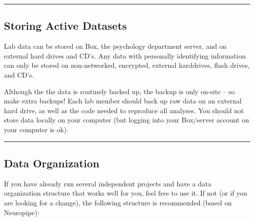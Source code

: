 \documentclass[]{book}
\begin{document}
\begin{center}\rule{0.5\linewidth}{\linethickness}\end{center}

\hypertarget{storing-active-datasets}{%
\subsection{Storing Active Datasets}\label{storing-active-datasets}}

Lab data can be stored on Box, the psychology department server, and on external hard drives and CD's. Any data with personally identifying information can only be stored on non-networked, encrypted, external harddrives, flash drives, and CD's.

Although the the data is routinely backed up, the backup is only on-site -- so make extra backups! Each lab member should back up raw data on an external hard drive, as well as the code needed to reproduce all analyses. You should not store data locally on your computer (but logging into your Box/server account on your computer is ok).

\begin{center}\rule{0.5\linewidth}{\linethickness}\end{center}

\hypertarget{data-organization}{%
\subsection{Data Organization}\label{data-organization}}

If you have already run several independent projects and have a data organization structure that works well for you, feel free to use it. If not (or if you are looking for a change), the following structure is recommended (based on Neuropipe):
\end{document}
